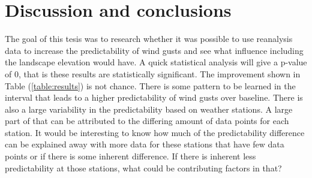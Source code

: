 \chapter{Discussion and conclusions}
\label{Chapter5}
The goal of this tesis was to research whether it was possible to use reanalysis data to increase the predictability of wind gusts and see what influence including the landscape elevation would have. A quick statistical analysis will give a p-value of 0, that is these results are statistically significant. The improvement shown in Table (\ref{table:results}) is not chance. There is some pattern to be learned in the interval that leads to a higher predictability of wind gusts over baseline. There is also a large variability in the predictability based on weather stations. A large part of that can be attributed to the differing amount of data points for each station. It would be interesting to know how much of the predictability difference can be explained away with more data for these stations that have few data points or if there is some inherent difference. If there is inherent less predictability at those stations, what could be contributing factors in that?

